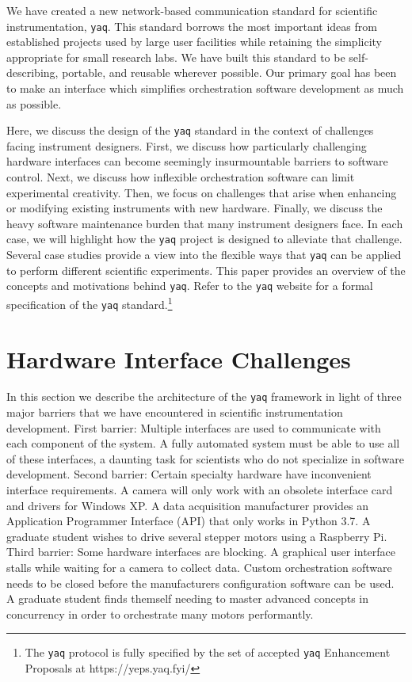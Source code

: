 \documentclass[aip, amsmath, amssymb, reprint,]{revtex4-2}
\newcommand\yaq{\texttt{yaq}}
\begin{document}
We have created a new network-based communication standard for scientific instrumentation, \yaq{}.
This standard borrows the most important ideas from established projects used by large user facilities while retaining the simplicity appropriate for small research labs.
We have built this standard to be self-describing, portable, and reusable wherever possible.
Our primary goal has been to make an interface which simplifies orchestration software development as much as possible.

Here, we discuss the design of the \yaq{} standard in the context of challenges facing instrument designers.
First, we discuss how particularly challenging hardware interfaces can become seemingly insurmountable barriers to software control.
Next, we discuss how inflexible orchestration software can limit experimental creativity.
Then, we focus on challenges that arise when enhancing or modifying existing instruments with new hardware.
Finally, we discuss the heavy software maintenance burden that many instrument designers face.
In each case, we will highlight how the \yaq{} project is designed to alleviate that challenge.
Several case studies provide a view into the flexible ways that \yaq{} can be applied to perform different scientific experiments.
This paper provides an overview of the concepts and motivations behind \yaq{}.
Refer to the \yaq{} website for a formal specification of the \yaq{} standard.\footnote{The \yaq{} protocol is fully specified by the set of accepted \yaq{} Enhancement Proposals at https://yeps.yaq.fyi/}

\section{Hardware Interface Challenges}

In this section we describe the architecture of the \yaq{} framework in light of three major barriers that we have encountered in scientific instrumentation development.
First barrier: Multiple interfaces are used to communicate with each component of the system.
A fully automated system must be able to use all of these interfaces, a daunting task for scientists who do not specialize in software development.
Second barrier: Certain specialty hardware have inconvenient interface requirements.
A camera will only work with an obsolete interface card and drivers for Windows XP.
A data acquisition manufacturer provides an Application Programmer Interface (API) that only works in Python 3.7.
A graduate student wishes to drive several stepper motors using a Raspberry Pi.
Third barrier: Some hardware interfaces are blocking.
A graphical user interface stalls while waiting for a camera to collect data.
Custom orchestration software needs to be closed before the manufacturers configuration software can be used.
A graduate student finds themself needing to master advanced concepts in concurrency in order to orchestrate many motors performantly.
\end{document}
